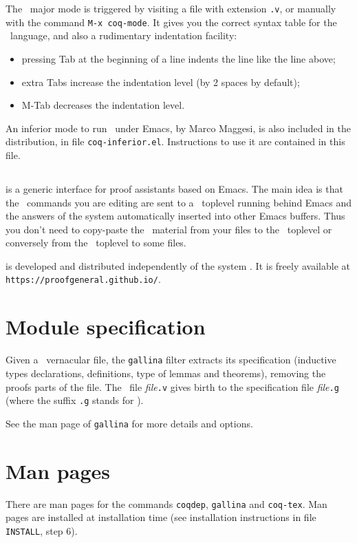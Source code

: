 The \Coq\ major mode is triggered by visiting a file with extension {\tt .v},
or manually with the command \verb!M-x coq-mode!.
It gives you the correct syntax table for
the \Coq\ language, and also a rudimentary indentation facility:
\begin{itemize}
  \item pressing {\sc Tab} at the beginning of a line indents the line like
    the line above;

  \item extra {\sc Tab}s increase the indentation level
    (by 2 spaces by default);

  \item M-{\sc Tab} decreases the indentation level.
\end{itemize}

An inferior mode to run \Coq\ under Emacs, by Marco Maggesi, is also
included in the distribution, in file \texttt{coq-inferior.el}.
Instructions to use it are contained in this file.

\subsection[{\ProofGeneral}]{{\ProofGeneral}}

{\ProofGeneral} is a generic interface for proof assistants based on
Emacs. The main idea is that the \Coq\ commands you are
editing are sent to a \Coq\ toplevel running behind Emacs and the
answers of the system automatically inserted into other Emacs buffers.
Thus you don't need to copy-paste the \Coq\ material from your files
to the \Coq\ toplevel or conversely from the \Coq\ toplevel to some
files.

{\ProofGeneral} is developed and distributed independently of the
system \Coq. It is freely available at \verb!https://proofgeneral.github.io/!.


\section[Module specification]{Module specification\label{gallina}}

Given a \Coq\ vernacular file, the {\tt gallina} filter extracts its
specification (inductive types declarations, definitions, type of
lemmas and theorems), removing the proofs parts of the file. The \Coq\
file {\em file}{\tt.v} gives birth to the specification file
{\em file}{\tt.g} (where the suffix {\tt.g} stands for \gallina).

See the man page of {\tt gallina} for more details and options.


\section[Man pages]{Man pages\label{ManPages}}

There are man pages for the commands {\tt coqdep}, {\tt gallina} and
{\tt coq-tex}. Man pages are installed at installation time
(see installation instructions in file {\tt INSTALL}, step 6).


